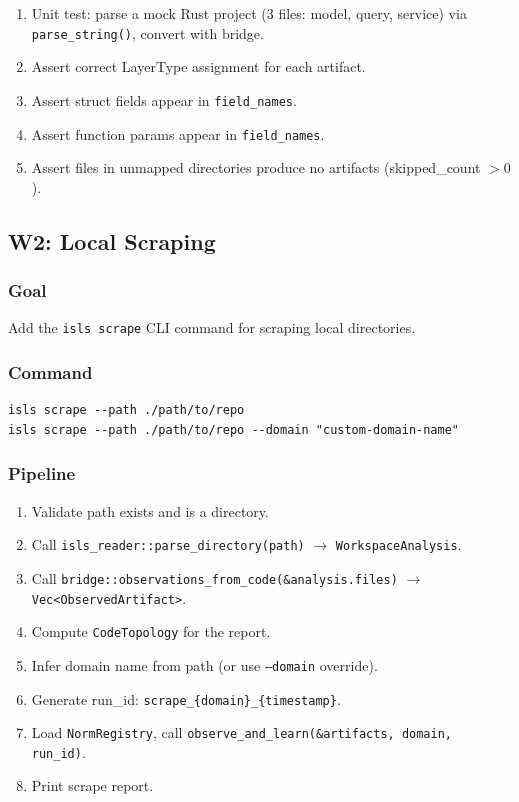 \documentclass[11pt,a4paper]{article}
\begin{document}
\begin{enumerate}[nosep]
\item Unit test: parse a mock Rust project (3 files: model, query,
      service) via \texttt{parse\_string()}, convert with bridge.
\item Assert correct LayerType assignment for each artifact.
\item Assert struct fields appear in \texttt{field\_names}.
\item Assert function params appear in \texttt{field\_names}.
\item Assert files in unmapped directories produce no artifacts
      (skipped\_count $> 0$).
\end{enumerate}


\subsection{W2: Local Scraping}
\label{sec:w2}

\subsubsection{Goal}

Add the \texttt{isls scrape} CLI command for scraping local directories.

\subsubsection{Command}

\begin{lstlisting}[style=bash]
isls scrape --path ./path/to/repo
isls scrape --path ./path/to/repo --domain "custom-domain-name"
\end{lstlisting}

\subsubsection{Pipeline}

\begin{enumerate}[nosep]
\item Validate path exists and is a directory.
\item Call \texttt{isls\_reader::parse\_directory(path)} $\to$
      \texttt{WorkspaceAnalysis}.
\item Call \texttt{bridge::observations\_from\_code(\&analysis.files)}
      $\to$ \texttt{Vec<ObservedArtifact>}.
\item Compute \texttt{CodeTopology} for the report.
\item Infer domain name from path (or use \texttt{--domain} override).
\item Generate run\_id: \texttt{scrape\_\{domain\}\_\{timestamp\}}.
\item Load \texttt{NormRegistry}, call
      \texttt{observe\_and\_learn(\&artifacts, domain, run\_id)}.
\item Print scrape report.
\end{enumerate}
\end{document}
